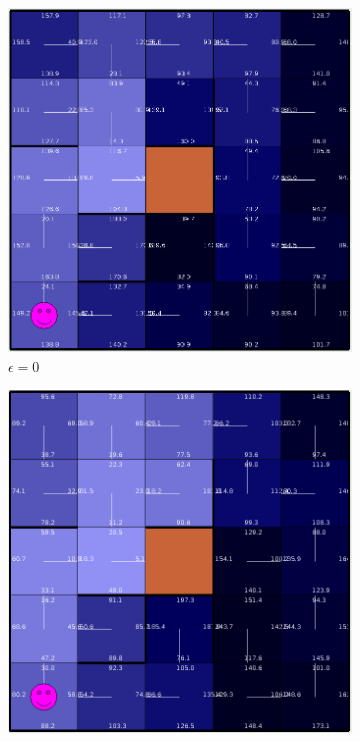 \documentclass[letterpaper]{article}
\begin{document}
	\begin{figure}
		\centering
		\begin{subfigure}{.3\textwidth}
			\centering
			\includegraphics[width=\linewidth]{images/small_ql_0}
			\caption{$\epsilon = 0$}
		\end{subfigure}
		\begin{subfigure}{.3\textwidth}
			\centering
			\includegraphics[width=\linewidth]{images/small_ql_01}

\end{subfigure}
\end{figure}
\end{document}
